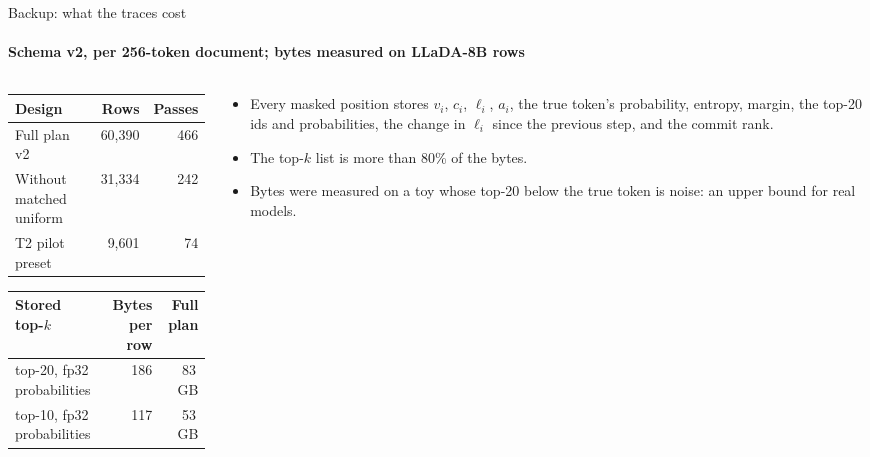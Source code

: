\documentclass[aspectratio=169,10pt,t]{beamer}
\begin{document}
\begin{frame}{Backup: what the traces cost}
  \framesubtitle{Schema v2, per 256-token document; bytes measured on LLaDA-8B rows}
  \vspace{2mm}
  \begin{columns}[T,onlytextwidth]
    \begin{column}{0.5\textwidth}
      \footnotesize
      \renewcommand{\arraystretch}{1.1}
      \begin{tabularx}{\linewidth}{@{}L r r@{}}
        \toprule
        {\color{ink2}Design} & {\color{ink2}Rows} & {\color{ink2}Passes} \\
        \midrule
        Full plan v2              & 60,390 & 466 \\
        Without matched uniform   & 31,334 & 242 \\
        T2 pilot preset           & 9,601  & 74 \\
        \bottomrule
      \end{tabularx}
      \vspace{3mm}
      \begin{tabularx}{\linewidth}{@{}L r r@{}}
        \toprule
        {\color{ink2}Stored top-$k$} & {\color{ink2}Bytes per row} & {\color{ink2}Full plan} \\
        \midrule
        top-20, fp32 probabilities & 186 & 83\,GB \\
        top-10, fp32 probabilities & 117 & 53\,GB \\
        \bottomrule
      \end{tabularx}
    \end{column}
    \begin{column}{0.46\textwidth}
      \begin{itemize}
        \item Every masked position stores $v_i$, $c_i$, $\ell_i$, $a_i$, the true token's
              probability, entropy, margin, the top-20 ids and probabilities, the change in
              $\ell_i$ since the previous step, and the commit rank.
        \item The top-$k$ list is more than 80\% of the bytes.
        \item Bytes were measured on a toy whose top-20 below the true token is noise: an
              upper bound for real models.
      \end{itemize}
    \end{column}
  \end{columns}
\end{frame}
\end{document}
